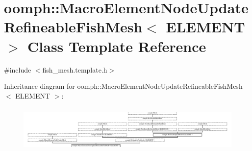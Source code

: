 \hypertarget{classoomph_1_1MacroElementNodeUpdateRefineableFishMesh}{}\section{oomph\+:\+:Macro\+Element\+Node\+Update\+Refineable\+Fish\+Mesh$<$ E\+L\+E\+M\+E\+NT $>$ Class Template Reference}
\label{classoomph_1_1MacroElementNodeUpdateRefineableFishMesh}


{\ttfamily \#include $<$fish\+\_\+mesh.\+template.\+h$>$}

Inheritance diagram for oomph\+:\+:Macro\+Element\+Node\+Update\+Refineable\+Fish\+Mesh$<$ E\+L\+E\+M\+E\+NT $>$\+:\begin{figure}[H]
\begin{center}
\leavevmode
\includegraphics[height=2.390244cm]{classoomph_1_1MacroElementNodeUpdateRefineableFishMesh}
\end{center}
\end{figure}
